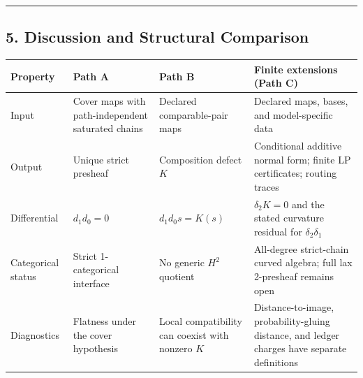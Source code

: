 \documentclass[
  english,
  10pt,
  a4paper,
]{article}
\begin{document}
\begin{center}\rule{0.5\linewidth}{0.5pt}\end{center}

\subsection{5. Discussion and Structural
Comparison}\label{discussion-and-structural-comparison}

\begin{longtable}[]{@{}
  >{\raggedright\arraybackslash}p{}
  >{\raggedright\arraybackslash}p{}
  >{\raggedright\arraybackslash}p{}
  >{\raggedright\arraybackslash}p{}@{}}
\toprule\noalign{}
\begin{minipage}[b]{\linewidth}\raggedright
Property
\end{minipage} & \begin{minipage}[b]{\linewidth}\raggedright
Path A
\end{minipage} & \begin{minipage}[b]{\linewidth}\raggedright
Path B
\end{minipage} & \begin{minipage}[b]{\linewidth}\raggedright
Finite extensions (Path C)
\end{minipage} \\
\midrule\noalign{}
\endhead
\bottomrule\noalign{}
\endlastfoot
Input & Cover maps with path-independent saturated chains & Declared
comparable-pair maps & Declared maps, bases, and model-specific data \\
Output & Unique strict presheaf & Composition defect \(K\) & Conditional
additive normal form; finite LP certificates; routing traces \\
Differential & \(d_1d_0=0\) & \(d_1d_0s=K(s)\) & \(\delta_2K=0\) and the
stated curvature residual for \(\delta_2\delta_1\) \\
Categorical status & Strict 1-categorical interface & No generic \(H^2\)
quotient & All-degree strict-chain curved algebra; full lax 2-presheaf
remains open \\
Diagnostics & Flatness under the cover hypothesis & Local compatibility
can coexist with nonzero \(K\) & Distance-to-image, probability-gluing
distance, and ledger charges have separate definitions \\
\end{longtable}
\end{document}
